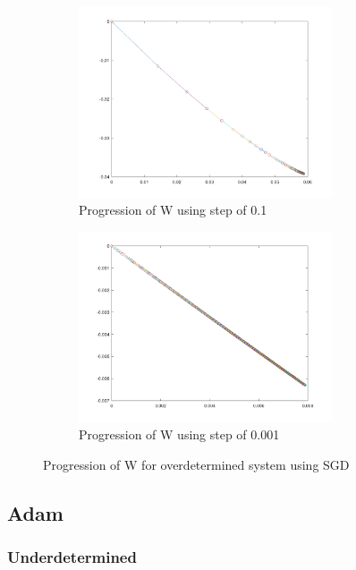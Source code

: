 \documentclass[a4paper]{article}    %
\begin{document}
\begin{figure}[H]
    \centering
    \begin{subfigure}{0.48\textwidth}
        \centering
        \includegraphics[width=7.5cm]{sgd_over_step_0_1}
        \caption{Progression of W using step of 0.1}
        \label{fig:sgd-over-0_1}
    \end{subfigure}
    \hfill
    \begin{subfigure}{0.48\textwidth}
        \centering
        \includegraphics[width=7.5cm]{sgd_over_step_0_001}
        \caption{Progression of W using step of 0.001}
        \label{fig:sgd-over-0_001}
    \end{subfigure}
    \hfill
    \caption{Progression of W for overdetermined system using SGD}
    \label{fig:sdg-over}
\end{figure}

\newpage

\subsection{Adam}

\subsubsection{Underdetermined}
\end{document}

